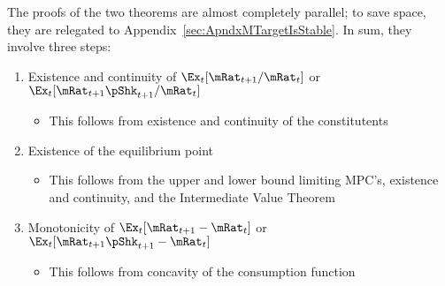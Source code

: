 \documentclass[BufferStockTheory]{subfiles}
\begin{document}

The proofs of the two theorems are almost completely parallel; to save space, they are relegated to Appendix~\ref{sec:ApndxMTargetIsStable}.  In sum, they involve three steps:

\begin{enumerate}
\item Existence and continuity of $\Ex_{t}[\mRat_{t+1}/\mRat_{t}]$ or $\Ex_{t}[\mRat_{t+1}\pShk_{t+1}/\mRat_{t}]$
  \begin{itemize}
    \item This follows from existence and continuity of the constitutents
    \end{itemize}
  \item Existence of the equilibrium point
    \begin{itemize}
    \item This follows from the upper and lower bound limiting MPC's, existence and continuity, and the Intermediate Value Theorem
    \end{itemize}
  \item Monotonicity of $\Ex_{t}[{\mRat}_{t+1}-\mRat_{t}]$ or $\Ex_{t}[{\mRat}_{t+1}\pShk_{t+1}-\mRat_{t}]$
    \begin{itemize}
    \item This follows from concavity of the consumption function
    \end{itemize}
\end{enumerate}

\end{document}

